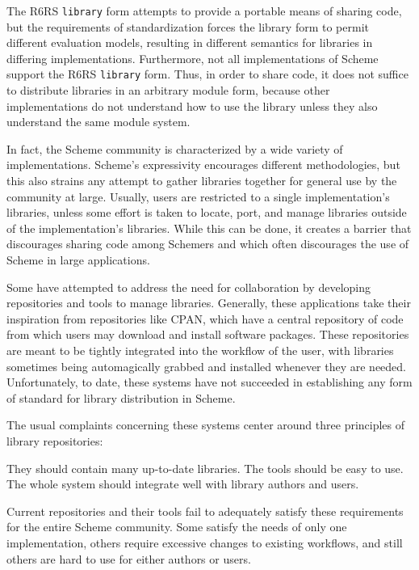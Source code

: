 The R6RS {\tt library} form attempts to provide a portable 
means of sharing code, 
but the requirements of standardization forces the
library form to permit different evaluation models, 
resulting in different semantics for libraries in 
differing implementations\cite{phasing}. 
Furthermore, not all implementations 
of Scheme support the R6RS {\tt library} form. 
Thus, in order to share code, 
it does not suffice to distribute libraries in an arbitrary module form,
because other implementations do not 
understand how to use the library unless they also 
understand the same module system.

In fact, the Scheme community is characterized by a wide 
variety of implementations.
Scheme's expressivity encourages different methodologies, 
but this also strains any attempt 
to gather libraries together for general use by the 
community at large. 
Usually, users are restricted to 
a single implementation's libraries, unless some effort is 
taken to locate, port, and manage libraries outside of the 
implementation's libraries. 
While this can be done, 
it creates a barrier that discourages 
sharing code among Schemers and 
which often discourages 
the use of Scheme in large applications.

Some have attempted to address the need for collaboration by
developing repositories and tools to manage libraries. 
Generally, these applications take
their inspiration from repositories like CPAN\cite{cpan}, 
which have a central repository of code from which users 
may download and install software
packages. These repositories are meant to be tightly integrated
into the workflow of the user, with libraries sometimes being
automagically grabbed and installed whenever they are needed.
Unfortunately, to date, these systems have not succeeded in
establishing any form of standard for library distribution
in Scheme. 

The usual complaints concerning these systems 
center around three principles of library repositories:

\unorderedlist
\li They should contain many up-to-date libraries.
\li The tools should be easy to use.
\li The whole system should integrate well with library authors and users.
\endunorderedlist

Current repositories and their tools fail to adequately 
satisfy these requirements for the entire Scheme community.
Some satisfy the needs of 
only one implementation\cite{planet}, others require excessive changes to existing 
workflows, and still others are hard to use for either authors or 
users.

